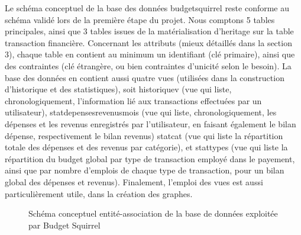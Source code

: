 \documentclass[a4paper,12pt]{article}
\begin{document}
Le schéma conceptuel de la base des données budgetsquirrel reste conforme au schéma validé lors de la première étape du projet. Nous comptons 5 tables principales, ainsi que 3 tables issues de la matérialisation d'heritage sur la table transaction financière.
Concernant les attributs (mieux détaillés dans la section 3), chaque table en contient au minimum un identifiant (clé primaire), ainsi que des contraintes (clé étrangère, ou bien contraintes d'unicité selon le besoin).
La base des données en contient aussi quatre vues (utilisées dans la construction d'historique et des statistiques), soit historique\textunderscore v (vue qui liste, chronologiquement, l'information lié aux transactions effectuées par un utilisateur), stat\textunderscore depenses\textunderscore revenus\textunderscore mois (vue qui liste, chronologiquement, les dépenses et les revenus enregistrés par l'utilisateur, en faisant également le bilan dépense, respectivement le bilan revenus) stat\textunderscore cat (vue qui liste la répartition totale des dépenses et des revenus par catégorie), et stat\textunderscore types (vue qui liste la répartition du budget global par type de transaction employé dans le payement, ainsi que par nombre d'emplois de chaque type de transaction, pour un bilan global des dépenses et revenus).
Finalement, l'emploi des vues est aussi particulièrement utile, dans la création des graphes.
\newpage

\begin{figure}[!ht]
\noindent
{}
\caption{\footnotesize{Schéma conceptuel entité-association de la base de données exploitée par Budget Squirrel}}
\end{figure}
\end{document}
